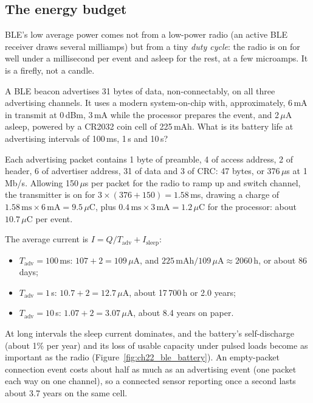 \subsection{The energy budget}

BLE's low average power comes not from a low-power radio (an active BLE receiver draws several
milliamps) but from a tiny \emph{duty cycle}: the radio is on for well under a millisecond per event
and asleep for the rest, at a few microamps. It is a firefly, not a candle.

\begin{worked}
A BLE beacon advertises 31 bytes of data, non-connectably, on all three advertising channels. It
uses a modern system-on-chip with, approximately, 6\,mA in transmit at 0\,dBm, 3\,mA while the
processor prepares the event, and 2\,$\mu$A asleep, powered by a CR2032 coin cell of 225\,mAh. What is
its battery life at advertising intervals of 100\,ms, 1\,s and 10\,s?

Each advertising packet contains 1 byte of preamble, 4 of access address, 2 of header, 6 of
advertiser address, 31 of data and 3 of CRC: 47 bytes, or 376\,$\mu$s at 1\,Mb/s. Allowing
150\,$\mu$s per packet for the radio to ramp up and switch channel, the transmitter is on for
$3\times(376+150)=1.58$\,ms, drawing a charge of $1.58\,\text{ms}\times6\,\text{mA}=9.5\,\mu$C, plus
$0.4\,\text{ms}\times3\,\text{mA}=1.2\,\mu$C for the processor: about $10.7\,\mu$C per event.

The average current is $I=Q/T_{\text{adv}}+I_{\text{sleep}}$:
\begin{itemize}
\item $T_{\text{adv}}=100$\,ms: $107+2=109\,\mu$A, and $225\,\text{mAh}/109\,\mu\text{A}\approx2060$\,h,
or about 86 days;
\item $T_{\text{adv}}=1$\,s: $10.7+2=12.7\,\mu$A, about 17\,700\,h or 2.0 years;
\item $T_{\text{adv}}=10$\,s: $1.07+2=3.07\,\mu$A, about 8.4 years on paper.
\end{itemize}
At long intervals the sleep current dominates, and the battery's self-discharge (about 1\% per year)
and its loss of usable capacity under pulsed loads become as important as the radio
(Figure~\ref{fig:ch22_ble_battery}). An empty-packet connection event costs about half as much as an
advertising event (one packet each way on one channel), so a connected sensor reporting once a second
lasts about 3.7 years on the same cell.
\end{worked}

